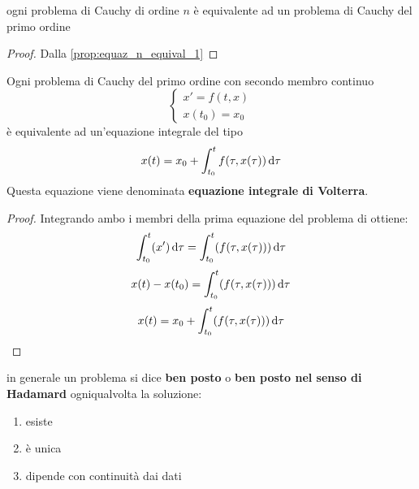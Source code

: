 \begin{proposition}
	ogni problema di Cauchy di ordine $n$ è equivalente ad un problema di Cauchy del primo ordine
	\begin{proof}
		Dalla \ref{prop:equaz_n_equival_1}
	\end{proof}
\end{proposition}
\begin{definition}
	\label{def:equaz_volterra}
	Ogni problema di Cauchy del primo ordine con secondo membro continuo
	$$\begin{cases}x'=f(t,x)\\x(t_0)=x_0\end{cases}$$
	è equivalente ad un'equazione integrale del tipo
	$$x(t)=x_0+\int_{t_0}^{t}f(\tau,x(\tau))\,\mathrm{d}{\tau}$$
	Questa equazione viene denominata \textbf{equazione integrale di Volterra}.
	\begin{proof}
		Integrando ambo i membri della prima equazione del problema di ottiene:
		$$\int_{t_0}^{t}( x')\,\mathrm{d}{\tau}=\int_{t_0}^{t}(f(\tau,x(\tau)))\,\mathrm{d}{\tau}$$
		$$x(t)-x(t_0)=\int_{t_0}^{t}(f(\tau,x(\tau)))\,\mathrm{d}{\tau}$$
		$$x(t)=x_0+\int_{t_0}^{t}(f(\tau,x(\tau)))\,\mathrm{d}{\tau}$$
	\end{proof}
\end{definition}

\begin{observation}
	in generale un problema si dice \textbf{ben posto} o \textbf{ben posto nel senso di Hadamard} ogniqualvolta la soluzione:
	\begin{enumerate}
		\item esiste
		\item è unica
		\item dipende con continuità dai dati
	\end{enumerate}
\end{observation}

